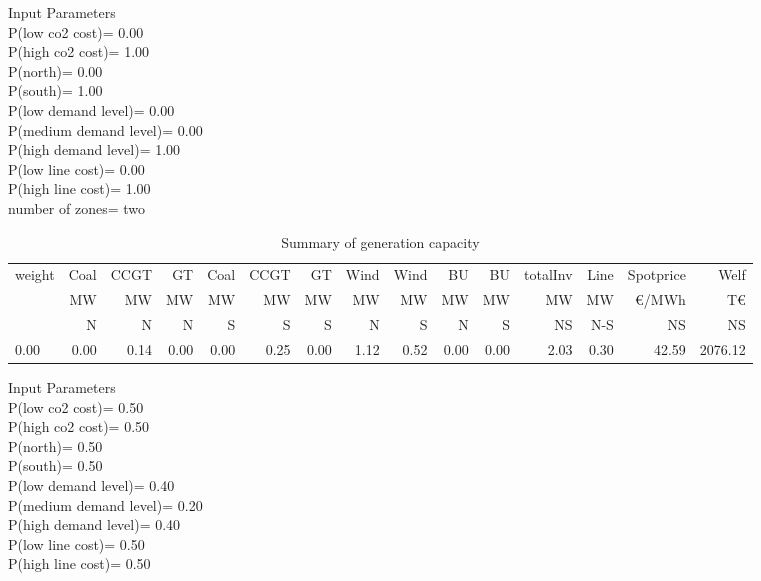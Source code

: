 \documentclass[landscape]{article}
\begin{document}
\noindent
Input Parameters\\
P(low co2 cost)=         0.00\\
P(high co2 cost)=         1.00\\
P(north)=         0.00\\
P(south)=         1.00\\
P(low demand level)=         0.00\\
P(medium demand level)=         0.00\\
P(high demand level)=         1.00\\
P(low line cost)=         0.00\\
P(high line cost)=         1.00\\
number of zones= two\\
\begin{table}[htb]\caption{Summary of generation capacity}
\begin{tabular}{l|rrrrrr|rr|rr|rr|rr}
\toprule
 weight &    Coal &     CCGT &      GT &   Coal  &   CCGT &      GT &    Wind &    Wind  &  BU  &  BU  & totalInv  &    Line   &  Spotprice   &  Welf   \\
        &      MW &       MW &      MW &      MW &     MW &      MW &      MW &      MW  &  MW  &  MW  &    MW     &    MW     &  \euro/MWh &  T\euro   \\
        &       N &       N  &      N  &      S  &      S &       S &       N &       S  &  N   &  S   &    NS     &    N-S    &  NS      &   NS    \\
\midrule
        0.00&        0.00&        0.14&        0.00&        0.00&        0.25&        0.00&        1.12&        0.52&        0.00&        0.00&        2.03&        0.30&       42.59&     2076.12\\
\bottomrule
\end{tabular}
\end{table}
\clearpage
\noindent
Input Parameters\\
P(low co2 cost)=         0.50\\
P(high co2 cost)=         0.50\\
P(north)=         0.50\\
P(south)=         0.50\\
P(low demand level)=         0.40\\
P(medium demand level)=         0.20\\
P(high demand level)=         0.40\\
P(low line cost)=         0.50\\
P(high line cost)=         0.50\\
\end{document}
